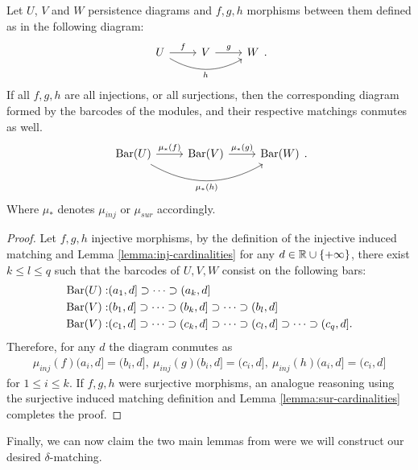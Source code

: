 \begin{lemma} \cite[Claim 3.1.13]{polterovich} \label{lemma:functoriality}
    Let $ U$, $V$ and $W$ persistence diagrams and $f, g, h$ morphisms between them defined as in the following diagram:
    $$
        \begin{tikzcd}
            U \arrow[r, "f"] \arrow[rr, "h"', bend right] & V \arrow[r, "g"] & W
        \end{tikzcd}.
    $$
    If all $ f, g, h$ are all injections, or all surjections, then the corresponding diagram formed by the barcodes of the modules, and their respective matchings conmutes as well.
    $$
        \begin{tikzcd}
            \barc(U) \arrow[r, "\mu_*(f)"] \arrow[rr, "\mu_*(h)"', bend right] & \barc(V) \arrow[r, "\mu_*(g)"] & \barc(W)
        \end{tikzcd}.
    $$
    Where $ \mu_* $ denotes $ \mu_{inj} $ or $ \mu_{sur} $ accordingly.
\end{lemma}
\begin{proof}
    Let $f, g, h$ injective morphisms, by the definition of the injective induced matching and Lemma \ref{lemma:inj-cardinalities} for any $ d \in \mathbb R \cup \{+ \infty\}$, there exist $ k \leq l \leq q $ such that the barcodes of $ U, V, W$ consist on the following bars:
    \begin{align*}
        \operatorname{Bar}(U):& (a_1, d] \supset \cdots \supset (a_k, d] \\
        \operatorname{Bar}(V):& (b_1, d] \supset \cdots \supset (b_k, d] \supset \cdots \supset (b_l, d] \\
        \operatorname{Bar}(V):& (c_1, d] \supset \cdots \supset (c_k, d] \supset \cdots \supset (c_l, d] \supset \cdots \supset (c_q, d]. \\
    \end{align*}
    Therefore, for any $ d $ the diagram conmutes as
    \begin{align*}
        \mu_{inj}(f)(a_i, d] = (b_i, d], \ \mu_{inj}(g)(b_i, d] = (c_i, d], \ \mu_{inj}(h)(a_i, d] = (c_i, d]
    \end{align*}
    for $ 1 \leq i \leq k$. If $f, g, h$ were surjective morphisms, an analogue reasoning using the surjective induced matching definition and Lemma \ref{lemma:sur-cardinalities} completes the proof.
\end{proof}

Finally, we can now claim the two main lemmas from were we will construct our desired $\delta$-matching.

